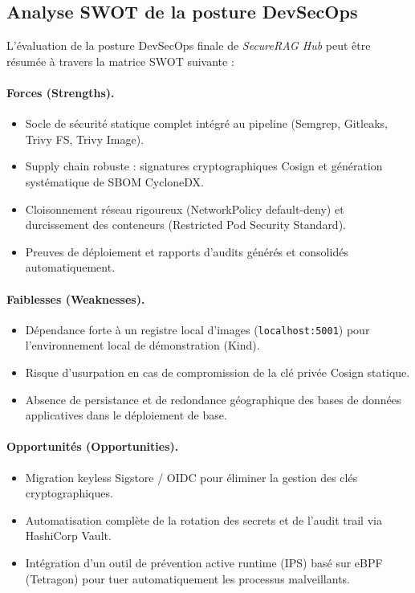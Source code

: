 \subsection{Analyse SWOT de la posture DevSecOps}
\label{subsec:analyse-swot}

L'évaluation de la posture DevSecOps finale de \textit{SecureRAG Hub} peut être résumée à travers la matrice SWOT suivante :

\paragraph{Forces (Strengths).}
\begin{itemize}
  \item Socle de sécurité statique complet intégré au pipeline (Semgrep, Gitleaks, Trivy FS, Trivy Image).
  \item Supply chain robuste : signatures cryptographiques Cosign et génération systématique de SBOM CycloneDX.
  \item Cloisonnement réseau rigoureux (NetworkPolicy default-deny) et durcissement des conteneurs (Restricted Pod Security Standard).
  \item Preuves de déploiement et rapports d'audits générés et consolidés automatiquement.
\end{itemize}

\paragraph{Faiblesses (Weaknesses).}
\begin{itemize}
  \item Dépendance forte à un registre local d'images (\texttt{localhost:5001}) pour l'environnement local de démonstration (Kind).
  \item Risque d'usurpation en cas de compromission de la clé privée Cosign statique.
  \item Absence de persistance et de redondance géographique des bases de données applicatives dans le déploiement de base.
\end{itemize}

\paragraph{Opportunités (Opportunities).}
\begin{itemize}
  \item Migration keyless Sigstore / OIDC pour éliminer la gestion des clés cryptographiques.
  \item Automatisation complète de la rotation des secrets et de l'audit trail via HashiCorp Vault.
  \item Intégration d'un outil de prévention active runtime (IPS) basé sur eBPF (Tetragon) pour tuer automatiquement les processus malveillants.
\end{itemize}

